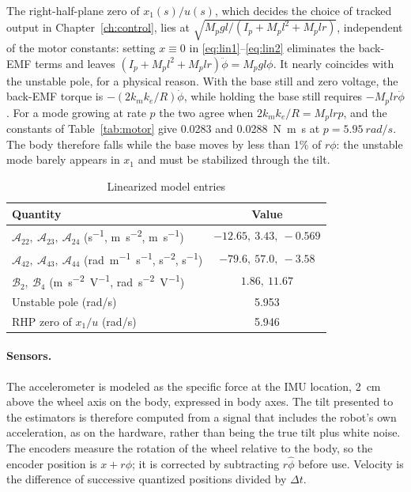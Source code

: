 The right-half-plane zero of $x_1(s)/u(s)$, which decides the choice of tracked
output in Chapter~\ref{ch:control}, lies at
$\sqrt{M_pgl/(I_p+M_pl^2+M_plr)}$, independent of the motor constants: setting
$x\equiv0$ in \eqref{eq:lin1}--\eqref{eq:lin2} eliminates the back-EMF terms
and leaves $(I_p+M_pl^2+M_plr)\ddot\phi=M_pgl\phi$. It nearly coincides with
the unstable pole, for a physical reason. With the base still and zero voltage,
the back-EMF torque is $-(2k_mk_e/R)\dot\phi$, while holding the base still
requires $-M_plr\ddot\phi$. For a mode growing at rate $p$ the two agree when
$2k_mk_e/R=M_plrp$, and the constants of Table~\ref{tab:motor} give
\num{0.0283} and \SI{0.0288}{N.m.s} at $p=\SI{5.95}{rad/s}$. The body therefore
falls while the base moves by less than 1\% of $r\phi$: the unstable mode barely
appears in $x_1$ and must be stabilized through the tilt.

\begin{table}[htbp]
\centering
\caption{Linearized model entries}
\label{tab:linvals}
\begin{tabular}{lc}
\toprule
Quantity & Value \\
\midrule
$\mathcal{A}_{22},\ \mathcal{A}_{23},\ \mathcal{A}_{24}$ (\si{s^{-1}}, \si{m.s^{-2}}, \si{m.s^{-1}}) & $-12.65,\ 3.43,\ -0.569$ \\
$\mathcal{A}_{42},\ \mathcal{A}_{43},\ \mathcal{A}_{44}$ (\si{rad.m^{-1}.s^{-1}}, \si{s^{-2}}, \si{s^{-1}}) & $-79.6,\ 57.0,\ -3.58$ \\
$\mathcal{B}_2,\ \mathcal{B}_4$ (\si{m.s^{-2}.V^{-1}}, \si{rad.s^{-2}.V^{-1}}) & $1.86,\ 11.67$ \\
Unstable pole (\si{rad/s}) & 5.953 \\
RHP zero of $x_1/u$ (\si{rad/s}) & 5.946 \\
\bottomrule
\end{tabular}
\end{table}

\paragraph{Sensors.} The accelerometer is modeled as the specific force at the
IMU location, \SI{2}{cm} above the wheel axis on the body, expressed in body
axes. The tilt presented to the estimators is therefore computed from a signal
that includes the robot's own acceleration, as on the hardware, rather than
being the true tilt plus white noise. The encoders measure the rotation of the
wheel relative to the body, so the encoder position is $x+r\phi$; it is
corrected by subtracting $r\hat\phi$ before use. Velocity is the difference of
successive quantized positions divided by $\Delta t$.

